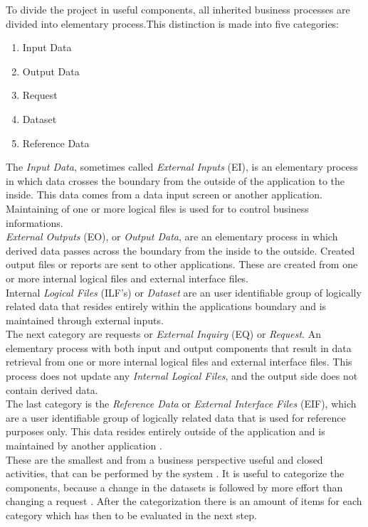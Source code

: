 To divide the project in useful components, all inherited business processes are divided into elementary process.This distinction is made into five categories:
\begin{enumerate}
	\item Input Data
	\item Output Data
	\item Request
	\item Dataset
	\item Reference Data
\end{enumerate}
The \textit{Input Data}, sometimes called \textit{External Inputs} (EI), is an elementary process in which data crosses the boundary from the outside of the application to the inside. This data comes from a data input screen or another application. Maintaining of one or more logical files is used for to control business informations.\\
\textit{External Outputs} (EO), or \textit{Output Data}, are an elementary process in which derived data passes across the boundary from the inside to the outside. Created output files or reports are sent to other applications. These are created from one or more internal logical files and external interface files.\\
Internal \textit{Logical Files} (ILF’s) or \textit{Dataset} are an user identifiable group of logically related data that resides entirely within the applications boundary and is maintained through external inputs.\\
The next category are requests or \textit{External Inquiry} (EQ) or \textit{Request}. An elementary process with both input and output components that result in data retrieval from one or more internal logical files and external interface files. This process does not update any \textit{Internal Logical Files}, and the output side does not contain derived data.\\
The last category is the \textit{Reference Data} or \textit{External Interface Files} (EIF), which are a user identifiable group of logically related data that is used for reference purposes only. This data resides entirely outside of the application and is maintained by another application \cite{fpafundamentals}.\\
These are the smallest and from a business perspective useful and closed activities, that can be performed by the system \cite{FPKompakt}. It is useful to categorize the components, because a change in the datasets is followed by more effort than changing a request \cite{itplanung}. After the categorization there is an amount of items for each category which has then to be evaluated in the next step.

